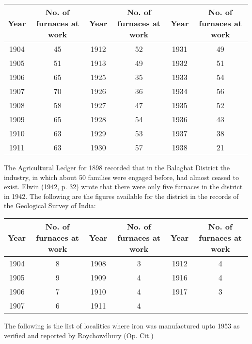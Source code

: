 \begin{longtable}{|c|c|c|c|c|c|}
\hline
\multicolumn{1}{|m{.5cm}|}{\textbf{Year}} & \multicolumn{1}{m{1.5cm}|}{\centering \textbf{No. of furnaces at work}} & 
\multicolumn{1}{m{.5cm}|}{\textbf{Year}} & \multicolumn{1}{m{1.5cm}|}{\centering \textbf{No. of furnaces at work}} & 
\multicolumn{1}{m{.5cm}|}{\textbf{Year}} & \multicolumn{1}{m{1.5cm}|}{\centering \textbf{No. of furnaces at work}}\\
\hline
1904 & 45 & 1912 & 52 & 1931 & 49\\
1905 & 51 & 1913 & 49 & 1932 & 51\\
1906 & 65 & 1925 & 35 & 1933 & 54\\
1907 & 70 & 1926 & 36 & 1934 & 56\\
1908 & 58 & 1927 & 47 & 1935 & 52\\
1909 & 65 & 1928 & 54 & 1936 & 43\\
1910 & 63 & 1929 & 53 & 1937 & 38\\
1911 & 63 & 1930 & 57 & 1938 & 21\\
\hline
\end{longtable}

The Agricultural Ledger for 1898 recorded that in the Balaghat District the industry, in which about 50 families were engaged before, had almost ceased to exist.  Elwin (1942, p. 32) wrote that there were only five furnaces in the district in 1942.  The following are the figures available for the district in the records of the Geological Survey of India:

\begin{center}
\begin{tabular}{|c|c|c|c|c|c|}
\hline
\multicolumn{1}{|m{.5cm}|}{\textbf{Year}} & \multicolumn{1}{m{1.5cm}|}{\centering \textbf{No. of furnaces at work}} & 
\multicolumn{1}{m{.5cm}|}{\textbf{Year}} & \multicolumn{1}{m{1.5cm}|}{\centering \textbf{No. of furnaces at work}} & 
\multicolumn{1}{m{.5cm}|}{\textbf{Year}} & \multicolumn{1}{m{1.5cm}|}{\centering \textbf{No. of furnaces at work}}\\
\hline
1904 & 8 & 1908 & 3 & 1912 & 4\\
1905 & 9 & 1909 & 4 & 1916 & 4\\
1906 & 7 & 1910 & 4 & 1917 & 3\\
1907 & 6 & 1911 & 4 &  & \\
\hline
\end{tabular}
\end{center}

The following is the list of localities where iron was manufactured upto 1953 as verified and reported by Roychowdhury (Op. Cit.) 

